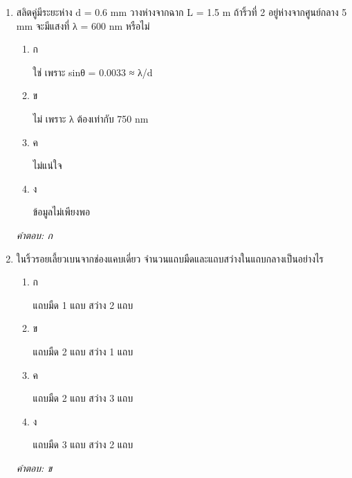 \documentclass[12pt]{article}
\begin{document}
\begin{enumerate}[label=\arabic*., itemsep=0.5\baselineskip, topsep=0.5\baselineskip, leftmargin=*]
\item สลิตคู่มีระยะห่าง d = 0.6 mm วางห่างจากฉาก L = 1.5 m ถ้าริ้วที่ 2 อยู่ห่างจากศูนย์กลาง 5 mm จะมีแสงที่ λ = 600 nm หรือไม่
\begin{enumerate}[label=\alph*)., itemsep=0.3\baselineskip, topsep=0.3\baselineskip]
\item ก\ 
\begin{minipage}[t]{0.9\linewidth}
\raggedright ใช่ เพราะ sinθ = 0.0033 ≈ λ/d
\end{minipage}
\item ข\ 
\begin{minipage}[t]{0.9\linewidth}
\raggedright ไม่ เพราะ λ ต้องเท่ากับ 750 nm
\end{minipage}
\item ค\ 
\begin{minipage}[t]{0.9\linewidth}
\raggedright ไม่แน่ใจ
\end{minipage}
\item ง\ 
\begin{minipage}[t]{0.9\linewidth}
\raggedright ข้อมูลไม่เพียงพอ
\end{minipage}
\end{enumerate}
\vspace{-0.3\baselineskip}
\begin{small}
\textit{คำตอบ: ก}
\end{small}

\item ในริ้วรอยเลี้ยวเบนจากช่องแคบเดี่ยว จำนวนแถบมืดและแถบสว่างในแถบกลางเป็นอย่างไร
\begin{enumerate}[label=\alph*)., itemsep=0.3\baselineskip, topsep=0.3\baselineskip]
\item ก\ 
\begin{minipage}[t]{0.9\linewidth}
\raggedright แถบมืด 1 แถบ สว่าง 2 แถบ
\end{minipage}
\item ข\ 
\begin{minipage}[t]{0.9\linewidth}
\raggedright แถบมืด 2 แถบ สว่าง 1 แถบ
\end{minipage}
\item ค\ 
\begin{minipage}[t]{0.9\linewidth}
\raggedright แถบมืด 2 แถบ สว่าง 3 แถบ
\end{minipage}
\item ง\ 
\begin{minipage}[t]{0.9\linewidth}
\raggedright แถบมืด 3 แถบ สว่าง 2 แถบ
\end{minipage}
\end{enumerate}
\vspace{-0.3\baselineskip}
\begin{small}
\textit{คำตอบ: ข}
\end{small}


\end{enumerate}
\end{document}
